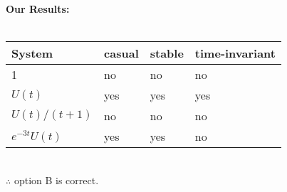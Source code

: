 \documentclass[journal,12pt,twocolumn]{IEEEtran}
\begin{document}
\textbf{Our Results:}\\\\
\begin{tabular}{|p{2cm}||p{1.5cm}|p{1.5cm}|p{1.5cm}|}
     \hline
     System & casual & stable & time-invariant\\
     \hline
     1 & no & no & no\\
     \hline
     $U(t)$ & yes & yes & yes\\
     \hline
     $U(t)/(t+1)$ & no & no & no\\
     \hline
     $e^{-3t}U(t)$ & yes & yes & no\\
     \hline
\end{tabular}\\

$\therefore$ option B is correct.
\end{document}
